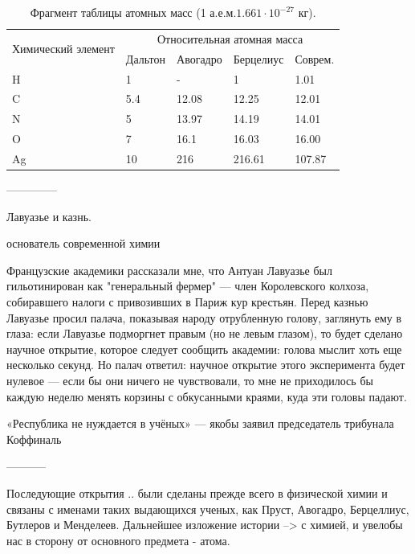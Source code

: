 \begin{table}
\label{tab:atom_mass}
    \begin{center}
        \begin{tabular}{|p{3cm}|p{2cm}|p{2cm}|p{2.2cm}|p{2cm}|}
            \hline
            \multirow{2}{}{Химический элемент} & \multicolumn{4}{|c|}{Относительная атомная масса} \\
            & Дальтон & Авогадро & Берцелиус & Соврем. \\
            \hline
            H & 1 & - & 1 & 1.01 \\
            C & 5.4 & 12.08 & 12.25 & 12.01 \\
            N & 5 & 13.97 & 14.19 & 14.01 \\
            O & 7 & 16.1 & 16.03 & 16.00 \\
            Ag & 10 & 216 & 216.61 & 107.87 \\
            \hline
        \end{tabular}
    \end{center}
\caption{Фрагмент таблицы атомных масс (1 а.е.м.\approx $1.661\cdot 10^{-27}$ кг).}
\end{table}



--------------

Лавуазье и казнь.

основатель современной химии

Французские академики рассказали мне, что Антуан Лавуазье был гильотинирован как "генеральный фермер" — член Королевского колхоза, собиравшего налоги с привозивших в Париж кур крестьян. Перед казнью Лавуазье просил палача, показывая народу отрубленную голову, заглянуть ему в глаза: если Лавуазье подморгнет правым (но не левым глазом), то будет сделано научное открытие, которое следует сообщить академии: голова мыслит хоть еще несколько секунд. Но палач ответил: научное открытие этого эксперимента будет нулевое — если бы они ничего не чувствовали, то мне не приходилось бы каждую неделю менять корзины с обкусанными краями, куда эти головы падают.

«Республика не нуждается в учёных» — якобы заявил председатель трибунала Коффиналь


-----------

Последующие открытия .. были сделаны прежде всего в физической химии и связаны с именами таких выдающихся ученых, как Пруст, Авогадро, Берцеллиус, Бутлеров и Менделеев. 
Дальнейшее изложение истории --> с химией, и увелобы нас в сторону от основного предмета - атома. 


